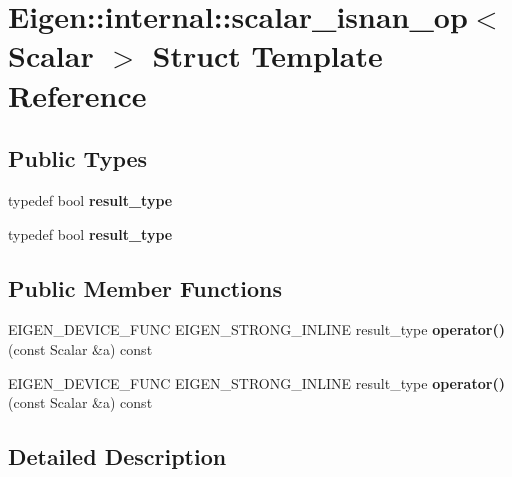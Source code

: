 \hypertarget{struct_eigen_1_1internal_1_1scalar__isnan__op}{}\section{Eigen\+:\+:internal\+:\+:scalar\+\_\+isnan\+\_\+op$<$ Scalar $>$ Struct Template Reference}
\label{struct_eigen_1_1internal_1_1scalar__isnan__op}
\subsection*{Public Types}
\begin{DoxyCompactItemize}
\item 
\mbox{\label{struct_eigen_1_1internal_1_1scalar__isnan__op_aba50210fe6c49ab02ebc00420fc4db6b}} 
typedef bool {\bfseries result\+\_\+type}
\item 
\mbox{\label{struct_eigen_1_1internal_1_1scalar__isnan__op_aba50210fe6c49ab02ebc00420fc4db6b}} 
typedef bool {\bfseries result\+\_\+type}
\end{DoxyCompactItemize}
\subsection*{Public Member Functions}
\begin{DoxyCompactItemize}
\item 
\mbox{\label{struct_eigen_1_1internal_1_1scalar__isnan__op_a57a5813e4bf9259acbeb41ad053f37c4}} 
E\+I\+G\+E\+N\+\_\+\+D\+E\+V\+I\+C\+E\+\_\+\+F\+U\+NC E\+I\+G\+E\+N\+\_\+\+S\+T\+R\+O\+N\+G\+\_\+\+I\+N\+L\+I\+NE result\+\_\+type {\bfseries operator()} (const Scalar \&a) const
\item 
\mbox{\label{struct_eigen_1_1internal_1_1scalar__isnan__op_a57a5813e4bf9259acbeb41ad053f37c4}} 
E\+I\+G\+E\+N\+\_\+\+D\+E\+V\+I\+C\+E\+\_\+\+F\+U\+NC E\+I\+G\+E\+N\+\_\+\+S\+T\+R\+O\+N\+G\+\_\+\+I\+N\+L\+I\+NE result\+\_\+type {\bfseries operator()} (const Scalar \&a) const
\end{DoxyCompactItemize}


\subsection{Detailed Description}
